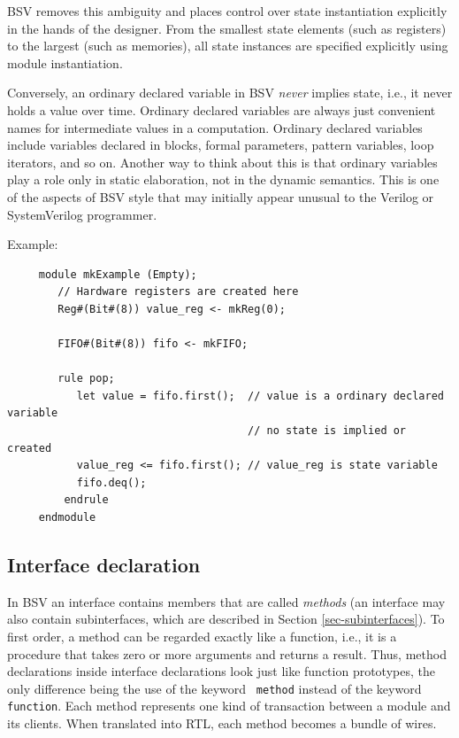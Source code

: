 \documentclass[twoside,letterpaper]{article}
\newcommand{\BSV}{BSV}
\newcommand{\SV}{SystemVerilog}
\newcommand{\V}{Verilog}
\begin{document}
{\BSV} removes this ambiguity and places control over state
instantiation explicitly in the hands of the designer.  From the
smallest state elements (such as registers) to the largest (such as
memories), all state instances are specified explicitly using module
instantiation.

Conversely, an ordinary declared variable in {\BSV} \emph{never}
implies state, i.e., it never holds a value over time.  Ordinary
declared variables are always just convenient names for intermediate
values in a computation.  Ordinary declared variables include
variables declared in blocks, formal parameters, pattern variables,
loop iterators, and so on.  Another way to think about this is that
ordinary variables play a role only in static elaboration, not in the
dynamic semantics. This is one of the aspects of {\BSV} style that
may initially appear unusual to the {\V} or {\SV} programmer.

Example:
\begin{verbatim}
     module mkExample (Empty);
        // Hardware registers are created here
        Reg#(Bit#(8)) value_reg <- mkReg(0);

        FIFO#(Bit#(8)) fifo <- mkFIFO;

        rule pop;
           let value = fifo.first();  // value is a ordinary declared variable
                                      // no state is implied or created
           value_reg <= fifo.first(); // value_reg is state variable
           fifo.deq();
         endrule
     endmodule
\end{verbatim}


\subsection{Interface declaration}

\label{sec-interface-decl}

 In {\BSV} an interface contains members that
are called \emph{methods}
(an interface may also contain subinterfaces, which are described in
Section \ref{sec-subinterfaces}).  To first order, a method can be
regarded exactly like a function, i.e., it is a procedure that takes
zero or more arguments and returns a result.  Thus, method
declarations inside interface declarations look just like function
prototypes, the only difference being the use of the keyword {\tt
method} instead of the keyword \texttt{function}.  Each method represents
one kind of transaction between a module and its clients.  When
translated into RTL, each method becomes a bundle of wires.
\end{document}
